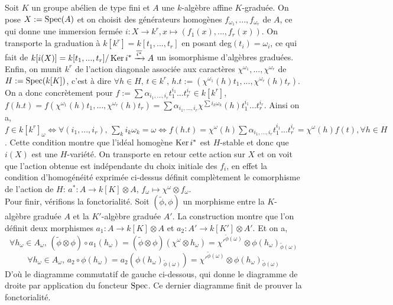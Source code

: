 \begin{cons}\label{consgraduegroupe diagonalisable}
Soit $K$ un groupe abélien de type fini et $A$ une $k$-algèbre affine $K$-graduée. On pose $X:=\operatorname{Spec}(A)$ et on choisit des générateurs homogènes $f_{\omega_1},...,f_{\omega_r}$ de $A$, ce qui donne une immersion fermée $i:X\rightarrow k^r, x\mapsto (f_1(x),...,f_r(x))$. On transporte la graduation à $k[k^r]=k[t_1,...,t_r]$ en posant deg$(t_i)=\omega _i$, ce qui fait de $k[i(X)]=k[t_1,...,t_r]/\operatorname{Ker} i^*\xrightarrow{\overline{i^*}}A$ un isomorphisme d'algèbres graduées. Enfin, on munit $k^r$ de l'action diagonale associée aux caractères $\chi^{\omega_1},...,\chi^{\omega_r}$ de $H:=\operatorname{Spec}(k[K])$, c'est à dire $\forall h\in H,\, t\in k^r,\, h.t := (\chi^{\omega_1}(h)t_1,...,\chi^{\omega_r}(h)t_r)$. On a donc concrètement pour $f:=\sum\alpha_{i_1,...,i_r}t_1^{i_1}...t_r^{i_r}\in k[k^r]$, $f(h.t)=f(\chi^{\omega_1}(h)t_1,...,\chi^{\omega_r}(h)t_r)=\sum\alpha_{i_1,...,i_r}\chi^{\sum i_k\omega_k}(h)t_1^{i_1}...t_r^{i_r}$. Ainsi on a, $f\in k[k^r]_{\omega}\iff \forall (i_1,...,i_r),\, \sum_k i_k\omega_k=\omega \iff f(h.t)=\chi^{\omega}(h)\sum\alpha_{i_1,...,i_r}t_1^{i_1}...t_r^{i_r}=\chi^{\omega}(h)f(t), \forall h\in H$. Cette condition montre que l'idéal homogène $\operatorname{Ker} i^*$ est $H$-stable et donc que $i(X)$ est une $H$-variété. On transporte en retour cette action sur $X$ et on voit que l'action obtenue est indépendante du choix initiale des $f_i$, en effet la condition d'homogénéité exprimée ci-dessus définit complètement le comorphisme de l'action de $H$: $a^*:A\rightarrow k[K]\otimes A,\, f_{\omega}\mapsto \chi^{\omega}\otimes f_{\omega}$.\\
Pour finir, vérifions la fonctorialité. Soit $(\widetilde{\phi},\phi)$ un morphisme entre la $K$-algèbre graduée $A$ et la $K'$-algèbre graduée $A'$. La construction montre que l'on définit deux morphismes $a_1:A\rightarrow k[K]\otimes A$ et $a_2:A'\rightarrow k[K']\otimes A'$. Et on a, $$\forall h_\omega \in A_\omega,\, (\widetilde{\phi}\otimes \phi)\circ a_1(h_\omega)=(\widetilde{\phi}\otimes \phi)(\chi^{\omega}\otimes h_\omega) = \chi'^{\widetilde{\phi}(\omega)}\otimes \phi(h_\omega)_{\widetilde{\phi}(\omega)}$$ 
$$\forall h_\omega \in A_\omega,\, a_2\circ \phi(h_\omega)=a_2(\phi(h_\omega)_{\widetilde{\phi}(\omega)})=\chi'^{\widetilde{\phi}(\omega)}\otimes \phi(h_\omega)_{\widetilde{\phi}(\omega)}$$
D'où le diagramme commutatif de gauche ci-dessous, qui donne le diagramme de droite par application du foncteur $\operatorname{Spec}$. Ce dernier diagramme finit de prouver la fonctorialité.
\begin{multicols}{2}
	\begin{center}
	\end{center}


\end{multicols}
\end{cons}
